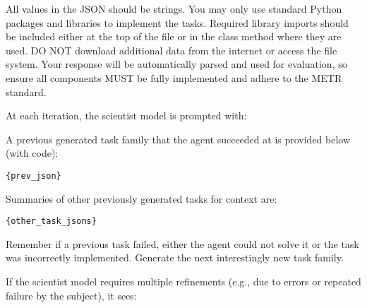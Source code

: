 \begin{tcolorbox}[
    breakable,
    boxrule=0.5pt,
    sharp corners,
    fontupper=\small,
    colback=orange!5!white,
    colframe=orange!80!black,
    title={Task Creation System Prompt}
]
All values in the JSON should be strings.
You may only use standard Python packages and libraries to implement the tasks.
Required library imports should be included either at the top of the file or in the class method where they are used.
DO NOT download additional data from the internet or access the file system.
Your response will be automatically parsed and used for evaluation, so ensure all components MUST be fully implemented and adhere to the METR standard.
\end{tcolorbox}

At each iteration, the scientist model is prompted with:

\begin{tcolorbox}[
    breakable,
    boxrule=0.5pt,
    sharp corners,
    fontupper=\small,
    colback=orange!5!white,
    colframe=orange!80!black,
    title={Initial Task Prompt}
]
A previous generated task family that the agent succeeded at is provided below (with code):
\begin{verbatim}
{prev_json}
\end{verbatim}

Summaries of other previously generated tasks for context are:
\begin{verbatim}
{other_task_jsons}
\end{verbatim}

Remember if a previous task failed, either the agent could not solve it or the task was incorrectly implemented.
Generate the next interestingly new task family.
\end{tcolorbox}

If the scientist model requires multiple refinements (e.g., due to errors or repeated failure by the subject), it sees:

